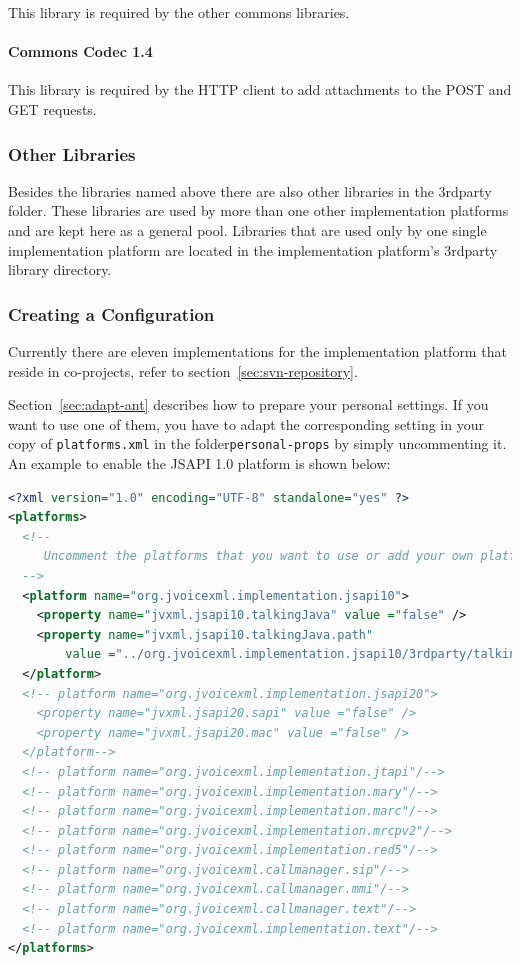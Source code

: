 \documentclass[11pt,a4paper]{article}
\begin{document}
This library is required by the other commons libraries.

\paragraph{Commons Codec 1.4}
\label{sec:commons-codec}

This library is required by the HTTP client to add attachments to the POST and
GET requests.

\subsubsection{Other Libraries}

Besides the libraries named above there are also other libraries in the
3rdparty folder. These libraries are used by more than one other implementation
platforms and are kept here as a general pool. Libraries that are used only by
one single implementation platform are located in the implementation platform's
3rdparty library directory.


\subsubsection{Creating a Configuration}
\label{sec:create-configuration}

Currently there are eleven implementations for the implementation platform
that reside in co-projects, refer to section~\ref{sec:svn-repository}.

Section~\ref{sec:adapt-ant} describes how to prepare your personal settings.
If you want to use one of them, you have to adapt the corresponding setting in
your copy of \texttt{platforms.xml} in the folder\texttt{personal-props} by
simply uncommenting it.
An example to enable the JSAPI 1.0 platform is shown below:
\begin{lstlisting}[language=XML]
<?xml version="1.0" encoding="UTF-8" standalone="yes" ?>
<platforms>
  <!--
     Uncomment the platforms that you want to use or add your own platform.
  -->
  <platform name="org.jvoicexml.implementation.jsapi10">
    <property name="jvxml.jsapi10.talkingJava" value ="false" />
    <property name="jvxml.jsapi10.talkingJava.path"
        value ="../org.jvoicexml.implementation.jsapi10/3rdparty/talkingjava/lib" />
  </platform>
  <!-- platform name="org.jvoicexml.implementation.jsapi20">
    <property name="jvxml.jsapi20.sapi" value ="false" />
    <property name="jvxml.jsapi20.mac" value ="false" />
  </platform-->
  <!-- platform name="org.jvoicexml.implementation.jtapi"/-->
  <!-- platform name="org.jvoicexml.implementation.mary"/-->
  <!-- platform name="org.jvoicexml.implementation.marc"/-->
  <!-- platform name="org.jvoicexml.implementation.mrcpv2"/-->
  <!-- platform name="org.jvoicexml.implementation.red5"/-->
  <!-- platform name="org.jvoicexml.callmanager.sip"/-->
  <!-- platform name="org.jvoicexml.callmanager.mmi"/-->
  <!-- platform name="org.jvoicexml.callmanager.text"/-->
  <!-- platform name="org.jvoicexml.implementation.text"/-->
</platforms>
\end{lstlisting}
\end{document}
